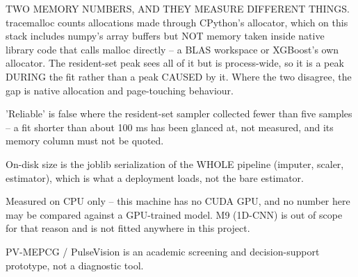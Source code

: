 \begin{table}[htbp]
\begin{tabular}{lrrrrrrrrrrrrrr}
    \bottomrule
  \end{tabular}
  \par\footnotesize TWO MEMORY NUMBERS, AND THEY MEASURE DIFFERENT THINGS. tracemalloc counts allocations made through CPython's allocator, which on this stack includes numpy's array buffers but NOT memory taken inside native library code that calls malloc directly -- a BLAS workspace or XGBoost's own allocator. The resident-set peak sees all of it but is process-wide, so it is a peak DURING the fit rather than a peak CAUSED by it. Where the two disagree, the gap is native allocation and page-touching behaviour.
  \par\footnotesize 'Reliable' is false where the resident-set sampler collected fewer than five samples -- a fit shorter than about 100 ms has been glanced at, not measured, and its memory column must not be quoted.
  \par\footnotesize On-disk size is the joblib serialization of the WHOLE pipeline (imputer, scaler, estimator), which is what a deployment loads, not the bare estimator.
  \par\footnotesize Measured on CPU only -- this machine has no CUDA GPU, and no number here may be compared against a GPU-trained model. M9 (1D-CNN) is out of scope for that reason and is not fitted anywhere in this project.
  \par\footnotesize PV-MEPCG / PulseVision is an academic screening and decision-support prototype, not a diagnostic tool.
\end{table}
